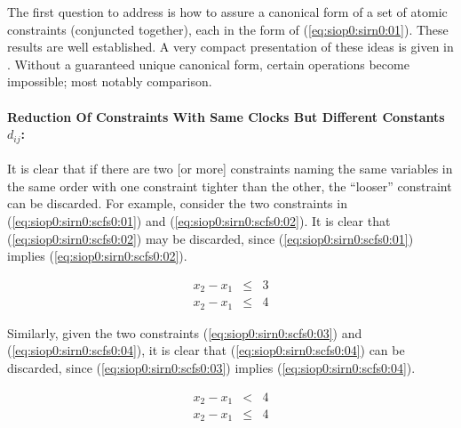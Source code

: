 The first question to address is how to assure a canonical
form of a set of atomic constraints (conjuncted together), each in the form
of (\ref{eq:siop0:sirn0:01}).  These results are well
established.  A very compact presentation of these ideas
is given in \cite[pp. 38-44]{bib:p:thsu2k:kglppet}.
Without a guaranteed unique canonical form, certain operations
become impossible; most notably comparison.


\paragraph{Reduction Of Constraints With Same Clocks But Different 
           Constants \mbox{\boldmath $d_{ij}$}:}

It is clear that if there are two [or more] constraints
naming the same variables in the same order with one constraint
tighter than the other, the ``looser'' constraint can be discarded.
For example, consider the two constraints in
(\ref{eq:siop0:sirn0:scfs0:01}) and (\ref{eq:siop0:sirn0:scfs0:02}).
It is clear that (\ref{eq:siop0:sirn0:scfs0:02}) may be discarded,
since (\ref{eq:siop0:sirn0:scfs0:01}) implies
(\ref{eq:siop0:sirn0:scfs0:02}).

\begin{eqnarray}
\label{eq:siop0:sirn0:scfs0:01} 
   x_2 - x_1 & \leq & 3 \\
\label{eq:siop0:sirn0:scfs0:02}
   x_2 - x_1 & \leq & 4
\end{eqnarray}

Similarly, given the two constraints 
(\ref{eq:siop0:sirn0:scfs0:03}) and 
(\ref{eq:siop0:sirn0:scfs0:04}), it is clear that
(\ref{eq:siop0:sirn0:scfs0:04}) can be discarded,
since (\ref{eq:siop0:sirn0:scfs0:03}) implies
(\ref{eq:siop0:sirn0:scfs0:04}).

\begin{eqnarray}
\label{eq:siop0:sirn0:scfs0:03} 
   x_2 - x_1 & < & 4 \\
\label{eq:siop0:sirn0:scfs0:04}
   x_2 - x_1 & \leq & 4
\end{eqnarray}



